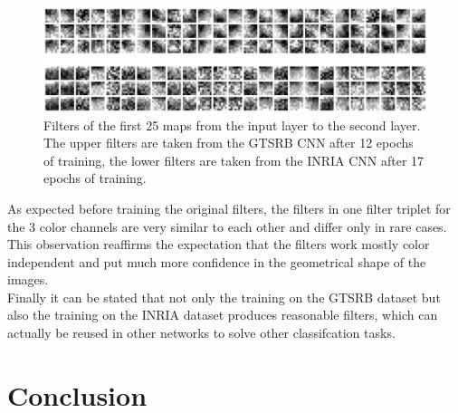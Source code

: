 \documentclass[11pt, a4paper]{article}
\begin{document}
\begin{figure}[h!]
	\centering
	\includegraphics[width=1\textwidth]{gtsrb_vs_inria_filters.png}
	\caption{Filters of the first 25 maps from the input layer to the second layer. The upper filters are taken from the GTSRB CNN after 12 epochs of training, the lower filters are taken from the INRIA CNN after 17 epochs of training.}
	\label{fig:gtsrb_vs_inria_filters}
\end{figure}

As expected before training the original filters, the filters in one filter triplet for the 3 color channels are very similar to each other and differ only in rare cases. This observation reaffirms the expectation that the filters work mostly color independent and put much more confidence in the geometrical shape of the images.\\
Finally it can be stated that not only the training on the GTSRB dataset but also the training on the INRIA dataset produces reasonable filters, which can actually be reused in other networks to solve other classifcation tasks.


\section{Conclusion}
\end{document}

